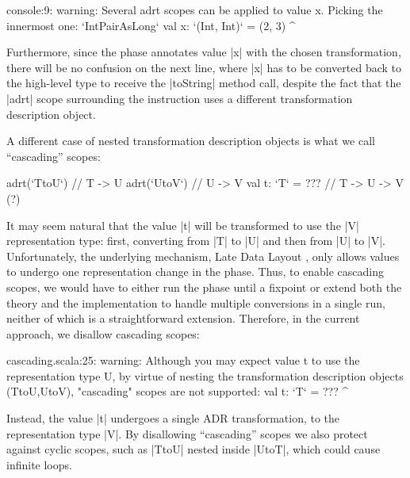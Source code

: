 \begin{lstlisting-nobreak}
console:9:  warning: Several adrt scopes can be applied to value x. Picking the innermost one: `IntPairAsLong`
val x: `(Int, Int)` = (2, 3)
          ^
\end{lstlisting-nobreak}

Furthermore, since the \inject{} phase annotates value |x| with the chosen transformation, there will be no confusion on the next line, where |x| has to be converted back to the high-level type to receive the |toString| method call, despite the fact that the |adrt| scope surrounding the instruction uses a different transformation description object.

A different case of nested transformation description objects is what we call ``cascading'' scopes:

\begin{lstlisting-nobreak}
adrt(`TtoU`) {             // T -> U
  adrt(`UtoV`) {           // U -> V
    val t: `T` = ???       // T -> U -> V (?)
  }
}
\end{lstlisting-nobreak}

It may seem natural that the value |t| will be transformed to use the |V| representation type: first, converting from |T| to |U| and then from |U| to |V|. Unfortunately, the underlying mechanism, Late Data Layout \cite{ldl}, only allows values to undergo one representation change in the \coerce{} phase. Thus, to enable cascading scopes, we would have to either run the \coerce{} phase until a fixpoint or extend both the theory and the implementation to handle multiple conversions in a single run, neither of which is a straightforward extension.
Therefore, in the current approach, we disallow cascading scopes:

\begin{lstlisting-nobreak}
cascading.scala:25:  warning: Although you may expect value t to use the representation type U, by virtue of nesting the transformation description objects (TtoU,UtoV), "cascading" scopes are not supported:
val t: `T` = ???
         ^
\end{lstlisting-nobreak}

Instead, the value |t| undergoes a single ADR transformation, to the representation type |V|. By disallowing ``cascading'' scopes we also protect against cyclic scopes, such as |TtoU| nested inside |UtoT|, which could cause infinite loops.

